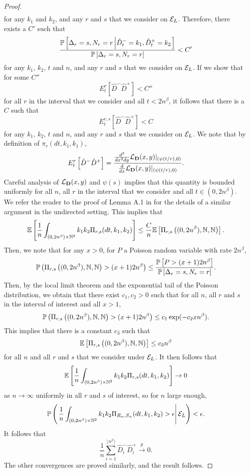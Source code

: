 \begin{proof}
\begin{align*}
\end{align*} for any $k_1$ and $k_2$, and any $r$ and $s$ that we consider on $\cE_L$. Therefore, there exists a $C'$ such that
$$\frac{\P\left[ \Delta_r=s, N_r=r \left| \hat{D}^-_t=k_1,\hat{D}^+_t=k_2\right.\right]}{\P\left[ \Delta_r=s, N_r=r\right]}<C'$$
for any $k_1$, $k_2$, $t$ and $n$, and any $r$ and $s$ that we consider on $\cE_L$. If we show that for some $C''$ $${E}^r_t\left[\hat{D}^-\hat{D}^+\right]<C''$$ for all $r$ in the interval that we consider and all $t<2n^\beta$, it follows that there is a $C$ such that
$${E}^{r,s}_t\left[\hat{D}^-\hat{D}^+\right]<C$$ 
for any $k_1$, $k_2$, $t$ and $n$, and any $r$ and $s$ that we consider on $\cE_L$.
We note that by definition of $\pi_r(dt,k_1,k_1)$, 
$${E}^r_t\left[\hat{D}^-\hat{D}^+\right]=\frac{\frac{d^3}{dx^2 dy}\cL_{\mathbf{D}}(x,y)|_{(\psi(t/r),0)}}{\frac{d}{dx}\cL_{\mathbf{D}}(x,y)|_{(\psi(t/r),0)}}.$$
Careful analysis of $\cL_{\mathbf{D}}(x,y)$ and $\psi(s)$ implies that this quantity is bounded uniformly for all $n$, all $r$ in the interval that we consider and all $t\in(0,2n^\beta)$. We refer the reader to the proof of Lemma A.1 in \cite{josephComponentSizesCritical2014} for the details of a similar argument in the undirected setting.
This implies that 
$$\E\left[\frac{1}{n}\int_{(0,2n^\beta)\times \N^2}k_1k_2 \Pi_{r,s}(dt,k_1,k_2) \right]\leq \frac{C}{n}\E\left[\Pi_{r,s}\left((0,2n^\beta),\N,\N\right)\right].$$
Then, we note that for any $x>0$, for $P$ a Poisson random variable with rate $2n^\beta$,
$$\P\left(\Pi_{r,s}\left((0,2n^\beta),\N,\N\right)>(x+1)2n^\beta\right)\leq \frac{\P\left[P>(x+1)2n^\beta \right]}{\P\left[ \Delta_r=s, N_r=r\right]}.$$
Then, by the local limit theorem and the exponential tail of the Poisson distribution, we obtain that there exist $c_1,c_2>0$ such that for all $n$, all $r$ and $s$ in the interval of interest and all $x>1$,
$$\P\left(\Pi_{r,s}\left((0,2n^\beta),\N,\N\right)>(x+1)2n^\beta\right)\leq c_1\exp(-c_2xn^\beta).$$
This implies that there is a constant $c_3$ such that 
$$\E\left[\Pi_{r,s}\left((0,2n^\beta),\N,\N\right)\right]\leq c_3 n^\beta$$
for all $n$ and all $r$ and $s$ that we consider under $\cE_L$. 
It then follows that 
$$\E\left[\frac{1}{n}\int_{(0,2n^\beta)\times \N^2}k_1k_2 \Pi_{r,s}(dt,k_1,k_2) \right]\to 0$$
as $n\to \infty$ uniformly in all $r$ and $s$ of interest, so for $n$ large enough,
$$\P\left(\left.\frac{1}{n}\int_{(0,2n^\beta)\times \N^2}k_1k_2 \Pi_{R_n,S_n}(dt,k_1,k_2)>\epsilon  \right|\cE_L \right)<\epsilon.$$
It follows that 
$$\frac{1}{n}\sum_{i=1}^{\lfloor n^\beta \rfloor}\hat{D}_i^- \hat{D}_i^+\overset{p}{\to}0.$$
The other convergences are proved similarly, and the result follows. 
\end{proof}